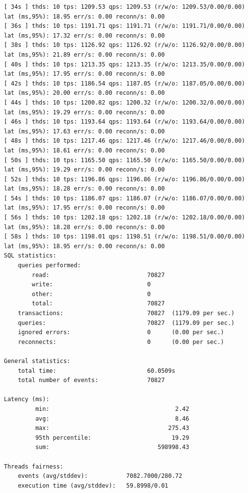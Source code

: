 \documentclass{article}
\begin{document}
\begin{verbatim}
[ 34s ] thds: 10 tps: 1209.53 qps: 1209.53 (r/w/o: 1209.53/0.00/0.00) lat (ms,95%): 18.95 err/s: 0.00 reconn/s: 0.00
[ 36s ] thds: 10 tps: 1191.71 qps: 1191.71 (r/w/o: 1191.71/0.00/0.00) lat (ms,95%): 17.32 err/s: 0.00 reconn/s: 0.00
[ 38s ] thds: 10 tps: 1126.92 qps: 1126.92 (r/w/o: 1126.92/0.00/0.00) lat (ms,95%): 21.89 err/s: 0.00 reconn/s: 0.00
[ 40s ] thds: 10 tps: 1213.35 qps: 1213.35 (r/w/o: 1213.35/0.00/0.00) lat (ms,95%): 17.95 err/s: 0.00 reconn/s: 0.00
[ 42s ] thds: 10 tps: 1186.54 qps: 1187.05 (r/w/o: 1187.05/0.00/0.00) lat (ms,95%): 20.00 err/s: 0.00 reconn/s: 0.00
[ 44s ] thds: 10 tps: 1200.82 qps: 1200.32 (r/w/o: 1200.32/0.00/0.00) lat (ms,95%): 19.29 err/s: 0.00 reconn/s: 0.00
[ 46s ] thds: 10 tps: 1193.64 qps: 1193.64 (r/w/o: 1193.64/0.00/0.00) lat (ms,95%): 17.63 err/s: 0.00 reconn/s: 0.00
[ 48s ] thds: 10 tps: 1217.46 qps: 1217.46 (r/w/o: 1217.46/0.00/0.00) lat (ms,95%): 18.61 err/s: 0.00 reconn/s: 0.00
[ 50s ] thds: 10 tps: 1165.50 qps: 1165.50 (r/w/o: 1165.50/0.00/0.00) lat (ms,95%): 19.29 err/s: 0.00 reconn/s: 0.00
[ 52s ] thds: 10 tps: 1196.86 qps: 1196.86 (r/w/o: 1196.86/0.00/0.00) lat (ms,95%): 18.28 err/s: 0.00 reconn/s: 0.00
[ 54s ] thds: 10 tps: 1186.07 qps: 1186.07 (r/w/o: 1186.07/0.00/0.00) lat (ms,95%): 17.95 err/s: 0.00 reconn/s: 0.00
[ 56s ] thds: 10 tps: 1202.18 qps: 1202.18 (r/w/o: 1202.18/0.00/0.00) lat (ms,95%): 18.28 err/s: 0.00 reconn/s: 0.00
[ 58s ] thds: 10 tps: 1198.01 qps: 1198.51 (r/w/o: 1198.51/0.00/0.00) lat (ms,95%): 18.95 err/s: 0.00 reconn/s: 0.00
SQL statistics:
    queries performed:
        read:                            70827
        write:                           0
        other:                           0
        total:                           70827
    transactions:                        70827  (1179.09 per sec.)
    queries:                             70827  (1179.09 per sec.)
    ignored errors:                      0      (0.00 per sec.)
    reconnects:                          0      (0.00 per sec.)

General statistics:
    total time:                          60.0509s
    total number of events:              70827

Latency (ms):
         min:                                    2.42
         avg:                                    8.46
         max:                                  275.43
         95th percentile:                       19.29
         sum:                               598998.43

Threads fairness:
    events (avg/stddev):           7082.7000/280.72
    execution time (avg/stddev):   59.8998/0.01

\end{verbatim}
\end{document}
